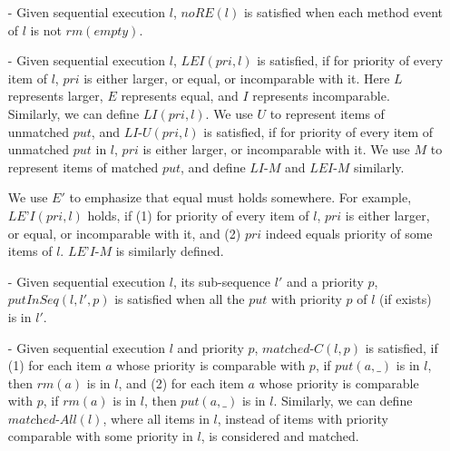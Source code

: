 \begin{itemize}
\setlength{\itemsep}{0.5pt}
\item[-] Given sequential execution $l$, $\textit{noRE}(l)$ is satisfied when each method event of $l$ is not $\textit{rm}(\textit{empty})$.

\item[-] Given sequential execution $l$, $\textit{LEI}(\textit{pri},l)$ is satisfied, if for priority of every item of $l$, $\textit{pri}$ is either larger, or equal, or incomparable with it. Here $L$ represents larger, $E$ represents equal, and $I$ represents incomparable. Similarly, we can define $\textit{LI}(\textit{pri},l)$. We use $U$ to represent items of unmatched $\textit{put}$, and $\textit{LI-U}(\textit{pri},l)$ is satisfied, if for priority of every item of unmatched $\textit{put}$ in $l$, $\textit{pri}$ is either larger, or incomparable with it. We use $M$ to represent items of matched $\textit{put}$, and define $\textit{LI-M}$ and $\textit{LEI-M}$ similarly.

    {\color {red} We use $E'$ to emphasize that equal must holds somewhere. For example, $\textit{LE'I}(\textit{pri},l)$ holds, if (1) for priority of every item of $l$, $\textit{pri}$ is either larger, or equal, or incomparable with it, and (2) $\textit{pri}$ indeed equals priority of some items of $l$. $\textit{LE'I-M}$ is similarly defined.}

\item[-] Given sequential execution $l$, its sub-sequence $l'$ and a priority $p$, $\textit{putInSeq}(l,l',p)$ is satisfied when all the $\textit{put}$ with priority $p$ of $l$ (if exists) is in $l'$.

\item[-] {\color {red}Given sequential execution $l$ and priority $p$, $\textit{matched-C}(l,p)$ is satisfied, if (1) for each item $a$ whose priority is comparable with $p$, if $\textit{put}(a,\_)$ is in $l$, then $\textit{rm}(a)$ is in $l$, and (2) for each item $a$ whose priority is comparable with $p$, if $\textit{rm}(a)$ is in $l$, then $\textit{put}(a,\_)$ is in $l$. Similarly, we can define $\textit{matched-All}(l)$, where all items in $l$, instead of items with priority comparable with some priority in $l$, is considered and matched.}
\end{itemize}


